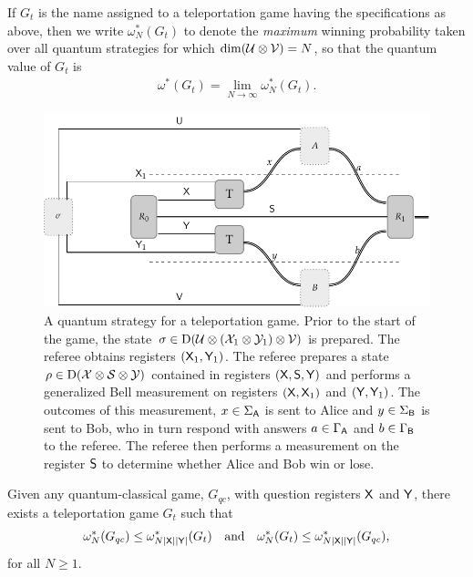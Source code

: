 If $G_t$ is the name assigned to a teleportation game having the specifications as above, then we write $\omega_N^*(G_t)$ to denote the \emph{maximum} winning probability taken over all quantum strategies for which $\dim(\mathcal{U} \otimes \mathcal{V}) = N$, so that the quantum value of $G_t$ is 
\begin{align}
	\omega^*(G_t) = \lim_{N \rightarrow \infty} \omega_N^*(G_t).
\end{align}

\begin{figure}[!htpb] 
	\begin{center}
		\includegraphics[scale=1.0]{figures/teleportation_game.pdf}
	\end{center}
		\caption[A quantum strategy for a teleportation game.]{A quantum strategy for a teleportation game. Prior to the start of the game, the state $\sigma \in \mathrm{D}(\mathcal{U} \otimes (\mathcal{X}_1 \otimes \mathcal{Y}_1) \otimes \mathcal{V})$ is prepared. The referee obtains registers $(\mathsf{X}_1,\mathsf{Y}_1)$. The referee prepares a state $\rho \in \mathrm{D}(\mathcal{X} \otimes \mathcal{S} \otimes \mathcal{Y})$ contained in registers $(\mathsf{X},\mathsf{S},\mathsf{Y})$ and performs a generalized Bell measurement on registers $(\mathsf{X},\mathsf{X}_1)$ and $(\mathsf{Y},\mathsf{Y}_1)$. The outcomes of this measurement, $x \in \Sigma_{\mathsf{A}}$ is sent to Alice and $y \in \Sigma_{\mathsf{B}}$ is sent to Bob, who in turn respond with answers $a \in \Gamma_{\mathsf{A}}$ and $b \in \Gamma_{\mathsf{B}}$ to the referee. The referee then performs a measurement on the register $\mathsf{S}$ to determine whether Alice and Bob win or lose.}
		\label{fig:teleportation-game}
\end{figure}

\begin{lemma} \label{lem:qcg_eq_telep}
	Given any quantum-classical game, $G_{qc}$, with question registers $\mathsf{X}$ and $\mathsf{Y}$, there exists a teleportation game $G_t$ such that 
	\begin{align}
		\omega_N^*(G_{qc}) \leq \omega_{N\left\lvert \mathsf{X} \right\rvert\left\lvert \mathsf{Y} \right\rvert}^*(G_t) \quad \textnormal{and} \quad \omega^*_{N}(G_t) \leq \omega^*_{N\left\lvert \mathsf{X} \right\rvert\left\lvert \mathsf{Y} \right\rvert}(G_{qc}),
	\end{align}		
for all $N \geq 1$.
\end{lemma}

